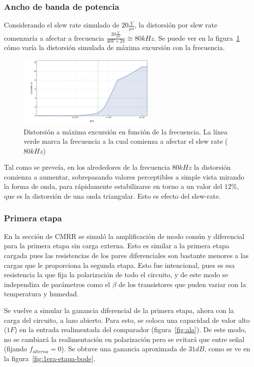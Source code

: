 \documentclass[a4paper,12pt,twoside]{article}
\begin{document}
\subsubsection{Ancho de banda de potencia}

Considerando el slew rate simulado de $20\frac{V}{\mu s}$, la distorsión por slew rate comenzaría a afectar a frecuencia $\frac{20\frac{V}{\mu s}}{40V \times 2\pi}\cong 80kHz$. Se puede ver en la figura~\ref{fig:distorsion-frec} cómo varía la distorsión simulada de máxima excursión con la frecuencia.


\begin{figure}[H]
	\centering
	\includegraphics[width=0.6\textwidth]{img/sim/distorsion-frec}
	\caption{Distorsión a máxima excursión en función de la frecuencia. La línea verde marca la frecuencia a la cual comienza a afectar el slew rate ($80kHz$)}
	\label{fig:distorsion-frec}
\end{figure}

Tal como se preveía, en los alrededores de la frecuencia $80kHz$ la distorsión comienza a aumentar, sobrepasando valores perceptibles a simple vista mirando la forma de onda, para rápidamente estabilizarse en torno a un valor del $12\%$, que es la distorsión de una onda triangular. Esto es efecto del slew-rate.


\subsubsection{Primera etapa}

En la sección de CMRR se simuló la amplificación de modo común y diferencial para la primera etapa sin carga externa. Esto es similar a la primera etapa cargada pues las resistencias de los pares diferenciales son bastante menores a las cargas que le proporciona la segunda etapa. Esto fue intencional, pues es esa resistencia la que fija la polarización de todo el circuito, y de este modo se independiza de parámetros como el $\beta$ de los transistores que puden variar con la temperatura y humedad.

Se vuelve a simular la ganancia diferencial de la primera etapa, ahora con la carga del circuito, a lazo abierto. Para esto, se coloca una capacidad de valor alto ($1F$) en la entrada realimentada del comparador (figura~\ref{fig:ala}). De este modo, no se cambiará la realimentación en polarización pero se evitará que entre señal (fijando $f_{alterna}=0$). Se obtuve una ganancia aproximada de $31dB$, como se ve en la figura~\ref{fig:1era-etapa-bode}.
\end{document}
